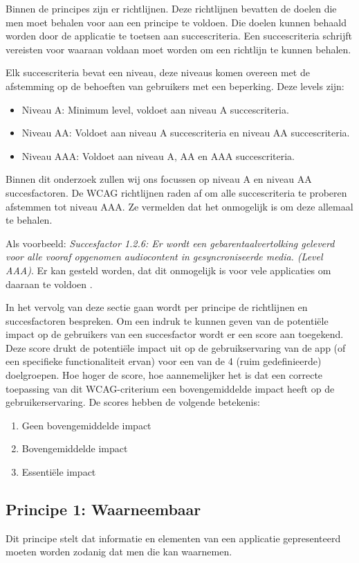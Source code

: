 Binnen de principes zijn er richtlijnen. Deze richtlijnen bevatten de doelen die men moet behalen voor aan een principe te voldoen. Die doelen kunnen behaald worden door de applicatie te toetsen aan succescriteria. Een succescriteria schrijft vereisten voor waaraan voldaan moet worden om een richtlijn te kunnen behalen. 

Elk succescriteria bevat een niveau, deze niveaus komen overeen met de afstemming op de behoeften van gebruikers met een beperking. Deze levels zijn:
\begin{itemize}
    \item Niveau A: Minimum level, voldoet aan niveau A succescriteria.
    \item Niveau AA: Voldoet aan niveau A succescriteria en niveau AA succescriteria.
    \item Niveau AAA: Voldoet aan niveau A, AA en AAA succescriteria.
\end{itemize}

Binnen dit onderzoek zullen wij ons focussen op niveau A en niveau AA succesfactoren. De WCAG richtlijnen raden af om alle succescriteria te proberen afstemmen tot niveau AAA. Ze vermelden dat het onmogelijk is om deze allemaal te behalen. 

Als voorbeeld:  \emph{Succesfactor 1.2.6: Er wordt een gebarentaalvertolking geleverd voor alle vooraf opgenomen audiocontent in gesyncroniseerde media. (Level AAA)}. Er kan gesteld worden, dat dit onmogelijk is voor vele applicaties om daaraan te voldoen \autocite{WCAG2.1Criteria}.

In het vervolg van deze sectie gaan wordt per principe de richtlijnen en succesfactoren bespreken. Om een indruk te kunnen geven van de potentiële impact op de gebruikers van een succesfactor wordt er een score aan toegekend. Deze score drukt de potentiële impact uit op de gebruikservaring van de app (of een specifieke functionaliteit ervan) voor een van de 4 (ruim gedefinieerde) doelgroepen.
Hoe hoger de score, hoe aannemelijker het is dat een correcte toepassing van dit WCAG-criterium een bovengemiddelde impact heeft op de gebruikerservaring. De scores hebben de volgende betekenis:
\begin{enumerate}
    \item Geen bovengemiddelde impact
    \item Bovengemiddelde impact
    \item Essentiële impact
\end{enumerate}

\newpage
\subsection{Principe 1: Waarneembaar}
\label{sec:waarneembaarWCAG}
Dit principe stelt dat informatie en elementen van een applicatie gepresenteerd moeten worden zodanig dat men die kan waarnemen.


